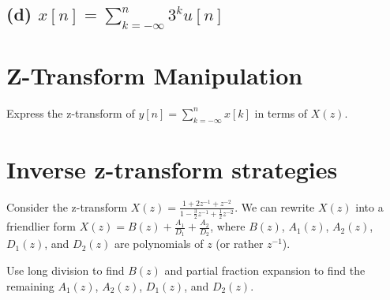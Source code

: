 \documentclass[11pt]{article}
\begin{document}


%
%

\subsection*{(d) $x[n]= \sum_{k=-\infty}^n3^ku[n]$}

%

\section{Z-Transform Manipulation}
Express the z-transform of $y[n]=\sum\limits_{k=-\infty}^nx[k]$ in terms of $X(z)$.

%

\section{Inverse z-transform strategies}

Consider the z-transform $X(z) = \frac{1+2z^{-1}+z^{-2}}{1-\frac{3}{2}z^{-1}+\frac{1}{2}z^{-2}}$. We can rewrite $X(z)$ into a friendlier form $X(z) = B(z) + \frac{A_1}{D_1} +\frac{A_2}{D_2}$, where $B(z)$, $A_1(z)$, $A_2(z)$, $D_1(z)$, and $D_2(z)$ are polynomials of $z$ (or rather $z^{-1}$). 

Use long division to find $B(z)$ and partial fraction expansion to find the remaining $A_1(z)$, $A_2(z)$, $D_1(z)$, and $D_2(z)$.
\end{document}
